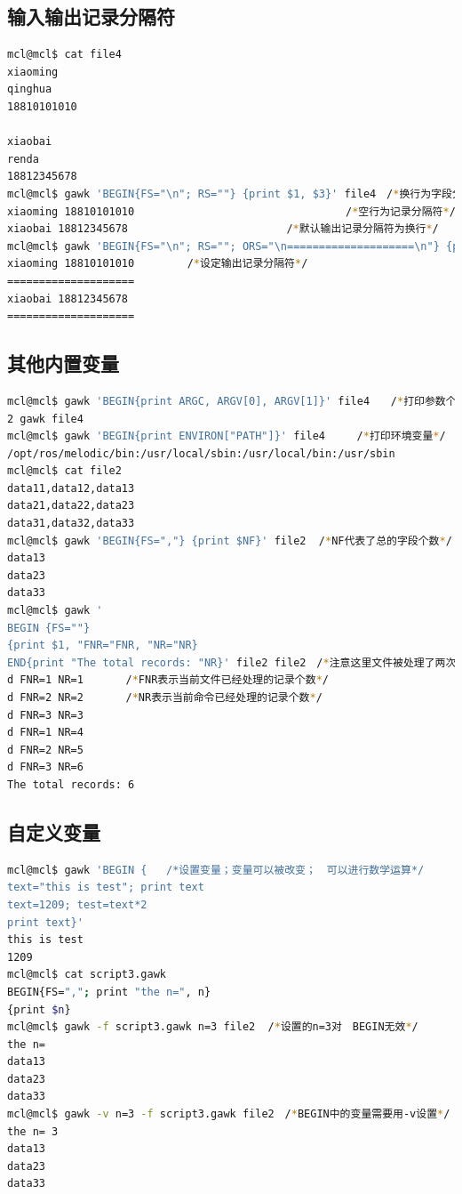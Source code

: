 \documentclass{article}
\begin{document}
\subsection{输入输出记录分隔符}
\begin{lstlisting}[language=bash, caption={2.3}]
mcl@mcl$ cat file4
xiaoming
qinghua
18810101010

xiaobai
renda
18812345678
mcl@mcl$ gawk 'BEGIN{FS="\n"; RS=""} {print $1, $3}' file4　/*换行为字段分隔符*/
xiaoming 18810101010　　　　　　　　　　　　　　　　　　　　/*空行为记录分隔符*/
xiaobai 18812345678　　　　　　　　　　　　　　　/*默认输出记录分隔符为换行*/
mcl@mcl$ gawk 'BEGIN{FS="\n"; RS=""; ORS="\n====================\n"} {print $1, $3}' file4
xiaoming 18810101010　　　　　/*设定输出记录分隔符*/
====================
xiaobai 18812345678
====================
\end{lstlisting}
\subsection{其他内置变量}
\begin{lstlisting}[language=bash, caption={2.４}]
mcl@mcl$ gawk 'BEGIN{print ARGC, ARGV[0], ARGV[1]}' file4　　/*打印参数个数和参数*/
2 gawk file4
mcl@mcl$ gawk 'BEGIN{print ENVIRON["PATH"]}' file4　　　/*打印环境变量*/
/opt/ros/melodic/bin:/usr/local/sbin:/usr/local/bin:/usr/sbin
mcl@mcl$ cat file2
data11,data12,data13
data21,data22,data23
data31,data32,data33
mcl@mcl$ gawk 'BEGIN{FS=","} {print $NF}' file2  /*NF代表了总的字段个数*/
data13
data23
data33
mcl@mcl$ gawk '
BEGIN {FS=""}
{print $1, "FNR="FNR, "NR="NR}
END{print "The total records: "NR}' file2 file2　/*注意这里文件被处理了两次*/
d FNR=1 NR=1　　　　/*FNR表示当前文件已经处理的记录个数*/
d FNR=2 NR=2　　　　/*NR表示当前命令已经处理的记录个数*/
d FNR=3 NR=3
d FNR=1 NR=4
d FNR=2 NR=5
d FNR=3 NR=6
The total records: 6
\end{lstlisting}
\subsection{自定义变量}
\begin{lstlisting}[language=bash, caption={2.5}]
mcl@mcl$ gawk 'BEGIN {   /*设置变量；变量可以被改变；　可以进行数学运算*/
text="this is test"; print text
text=1209; test=text*2
print text}'
this is test
1209
mcl@mcl$ cat script3.gawk 
BEGIN{FS=","; print "the n=", n}
{print $n}
mcl@mcl$ gawk -f script3.gawk n=3 file2  /*设置的n=3对　BEGIN无效*/
the n= 
data13
data23
data33
mcl@mcl$ gawk -v n=3 -f script3.gawk file2　/*BEGIN中的变量需要用-v设置*/
the n= 3
data13
data23
data33
\end{lstlisting}
\end{document}
